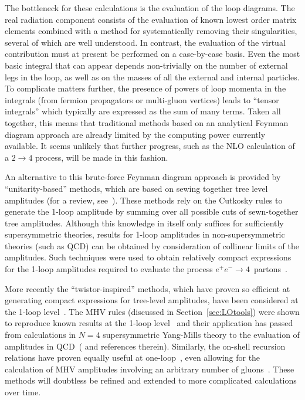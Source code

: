 \documentclass[12pt]{iopart}
\begin{document}
The bottleneck for these calculations is the evaluation of the loop diagrams. The real
radiation component consists of the evaluation of known lowest order matrix elements
combined with a method for systematically removing their singularities, several of which are
well understood. In contrast, the evaluation of the virtual contribution must at present be
performed on a case-by-case basis. Even the most basic integral that can appear depends
non-trivially on the number of external legs in the loop, as well as on the masses of all the
external and internal particles. To complicate matters further, the presence of powers of loop
momenta in the integrals (from fermion propagators or multi-gluon vertices) leads to ``tensor
integrals'' which typically are expressed as the sum of many terms. Taken all together, this
means that traditional methods based on an analytical Feynman diagram approach are already
limited by the computing power currently available. It seems unlikely that further progress,
such as the NLO calculation of a $2 \to 4$ process, will be made in this fashion.

An alternative to this brute-force Feynman diagram approach is provided by
``unitarity-based'' methods, which are based on sewing together tree level amplitudes
(for a review, see~\cite{Bern:1996je}). These methods rely on the Cutkosky rules to
generate the 1-loop amplitude by summing over all possible cuts of sewn-together tree
amplitudes. Although this knowledge in itself only suffices for sufficiently
supersymmetric theories, results for 1-loop amplitudes in non-supersymmetric theories
(such as QCD) can be obtained by consideration of collinear limits of the amplitudes.
Such techniques were used to obtain relatively compact expressions for the 1-loop
amplitudes required to evaluate the process $e^+ e^- \to 4$~partons~\cite{Bern:1997sc}.

More recently the ``twistor-inspired'' methods, which have proven so efficient at
generating compact expressions for tree-level amplitudes, have been considered at the
1-loop level~\cite{Cachazo:2004zb}. The MHV rules (discussed in Section~\ref{sec:LOtools})
were shown to reproduce known
results at the 1-loop level~\cite{Brandhuber:2004yw} and their application has passed
from calculations in $N=4$ supersymmetric Yang-Mills theory to the evaluation of
amplitudes in QCD~(\cite{Brandhuber:2005jw} and references therein). Similarly, the
on-shell recursion relations have proven equally useful at one-loop~\cite{Bern:2005hs},
even allowing for the calculation of MHV amplitudes involving an arbitrary number
of gluons~\cite{Forde:2005hh}. These methods will doubtless be refined and extended
to more complicated calculations over time.
\end{document}
